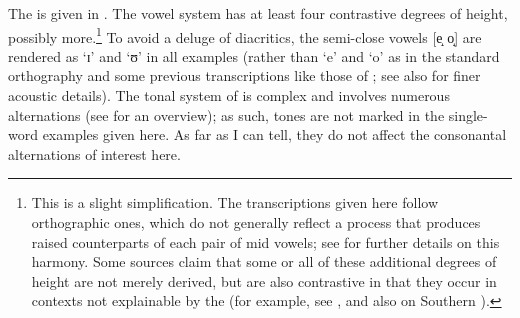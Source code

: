 \documentclass[output=paper,newtxmath,modfonts,nonflat]{langsci/langscibook}
\begin{document}
The  is given in  \citep{Bennett2016}. The vowel system has at least four contrastive degrees of height, possibly more.\footnote{This is a slight simplification. The transcriptions given here follow  orthographic ones, which do not generally reflect a  process that produces raised counterparts of each pair of mid vowels; see \citet{Dichabe1997} for further details on this harmony. Some sources claim that some or all of these additional degrees of height are not merely derived, but are also contrastive in that they occur in contexts not explainable by the  (for example, see \citealt{chebanneetal1997,Creissels2005emergence}, and also \citealt{Khabanyane1991} on Southern ).} To avoid a deluge of diacritics, the semi-close vowels [e̝ o̝] are rendered as ‘ɪ’ and ‘ʊ’ in all examples (rather than ‘e’ and ‘o’ as in the standard orthography and some previous transcriptions like those of \citealt{Cole1955}; see also \citealt{Roux2008} for finer acoustic details). The tonal system of  is complex and involves numerous alternations (see \citealt{chebanneetal1997} for an overview); as such, tones are not marked in the single-word examples given here. As far as I can tell, they do not affect the consonantal alternations of interest here.
\end{document}
